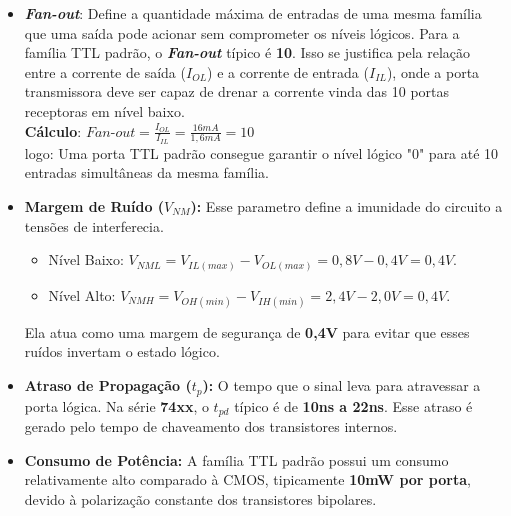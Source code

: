 \documentclass[11pt]{report}         %
\begin{document}
  \begin{itemize}
    
    \item \textbf{\textit{Fan-out}}: Define a quantidade máxima de entradas de uma mesma família que uma saída pode acionar sem comprometer os níveis lógicos.
    Para a família TTL padrão, o \textbf{\textit{Fan-out}} típico é \textbf{10}. Isso se justifica pela relação entre a corrente de saída ($I_{OL}$) 
    e a corrente de entrada ($I_{IL}$),  onde a porta transmissora deve ser capaz de drenar a corrente vinda das 10 portas receptoras em nível baixo.\\

    \textbf{Cálculo}: $\textit{Fan-out} = \frac{I_{OL}}{I_{IL}} = \frac{16mA}{1,6mA} = 10$\\
      
    logo: Uma porta TTL padrão consegue garantir o nível lógico "0" para até 10 entradas simultâneas da mesma família.    

    \item \textbf{Margem de Ruído ($V_{NM}$):} Esse parametro define a imunidade do circuito a tensões de interferecia. 
    
    \begin{itemize}
    
      \item Nível Baixo: $V_{NML} = V_{IL(max)} - V_{OL(max)} = 0,8V - 0,4V = 0,4V$.
      
      \item Nível Alto: $V_{NMH} = V_{OH(min)} - V_{IH(min)} = 2,4V - 2,0V = 0,4V$.
    
    \end{itemize}

    Ela atua como uma margem de segurança de \textbf{0,4V} para evitar que esses ruídos invertam o estado lógico.

    \item \textbf{Atraso de Propagação ($t_p$):} O tempo que o sinal leva para atravessar a porta lógica. Na série \textbf{74xx}, 
    o $t_{pd}$ típico é de \textbf{10ns a 22ns}. 
    Esse atraso é gerado pelo tempo de chaveamento dos transistores internos.

    \item \textbf{Consumo de Potência:} A família TTL padrão possui um consumo relativamente alto comparado à CMOS, tipicamente \textbf{10mW por porta}, 
    devido à polarização constante dos transistores bipolares.
  
  \end{itemize}
\end{document}
